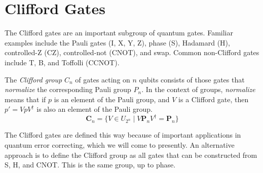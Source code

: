 
\clearpage


\section{Clifford Gates}

The Clifford gates are an important subgroup of quantum gates. Familiar examples include the Pauli gates (I, X, Y, Z), phase (S), Hadamard (H), controlled-Z (CZ), controlled-not (CNOT), and swap.  Common non-Clifford gates include T, B, and Toffolli (CCNOT). 

The {\sl Clifford group}  $C_n$ of gates acting on $n$ qubits consists of those gates that {\sl normalize} the corresponding Pauli group $P_n$. In the context of groups, {\sl normalize} means that if $p$ is an element of the Pauli group, and $V$ is a Clifford gate, then $p' = V p V^\dagger$ is also an element of the Pauli group.
\[
\mathbf{C}_n=\{V\in U_{2^n}\mid V\mathbf{P}_nV^\dagger = \mathbf{P}_n\}
\]

The Clifford gates are defined this way because of important applications in quantum  error correcting, which we will come to presently.
An alternative approach is to define the Clifford group as all gates that can be constructed from S, H, and CNOT. This is the same group, up to phase. 


